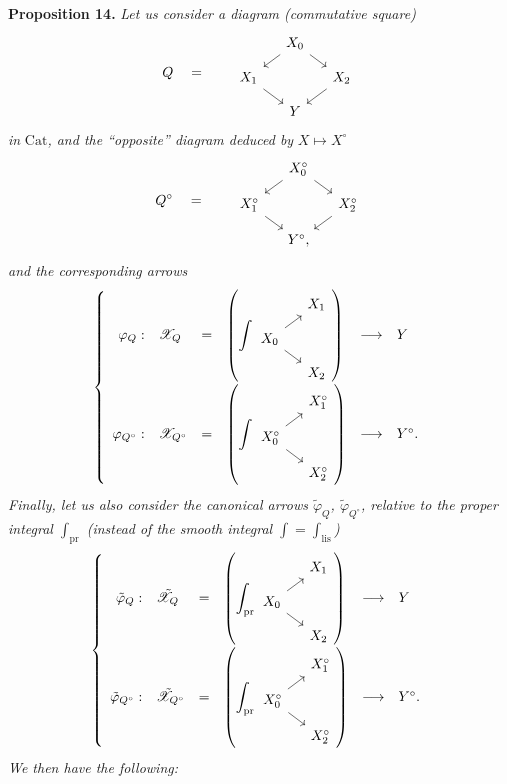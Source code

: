 \documentclass[11pt]{article}
\newcommand{\printedpage}[1]{\marginpar{\footnotesize p.~#1}}
\newcommand{\msp}[1]{\marginpar{\footnotesize [#1]}}
\newcommand{\Cat}{\mathrm{Cat}}
\newcommand{\sX}{\mathscr{X}}
\newcommand{\tsX}{\tilde{\mathscr{X}}}
\begin{document}
\textbf{Proposition 14.} \textit{Let us consider a diagram (commutative square)}
\[
Q \quad = \qquad
\begin{tikzcd}[row sep=small, column sep=small]
 & X_0 \arrow[dl] \arrow[dr] & \\
X_1 \arrow[dr] & & X_2 \arrow[dl] \\
 & Y &
\end{tikzcd}
\]
\textit{in} $\Cat$\textit{, and the ``opposite'' diagram deduced by} $X\longmapsto X^\circ$
\[
Q^\circ \quad = \qquad
\begin{tikzcd}[row sep=small, column sep=small]
 & X_0^\circ \arrow[dl] \arrow[dr] & \\
X_1^\circ \arrow[dr] & & X_2^\circ \arrow[dl] \\
 & Y^\circ, &
\end{tikzcd}
\]
\msp{page 141}
\textit{and the corresponding arrows}
\[
\left\{
\begin{array}{rlclcl}
\varphi_Q : & \sX_Q & = &
\left(\displaystyle\int
\begin{tikzcd}[ampersand replacement=\&, row sep=small, column sep=small]
 \& X_1 \\
X_0 \arrow[ur] \arrow[dr] \& \\
 \& X_2
\end{tikzcd}
\right)
& \longrightarrow & Y \\[2ex]
\varphi_{Q^\circ} : & \sX_{Q^\circ} & = &
\left(\displaystyle\int
\begin{tikzcd}[ampersand replacement=\&, row sep=small, column sep=small]
 \& X_1^\circ \\
X_0^\circ \arrow[ur] \arrow[dr] \& \\
 \& X_2^\circ
\end{tikzcd}
\right)
& \longrightarrow & Y^\circ.
\end{array}
\right.
\]
\textit{Finally, let us also consider the canonical arrows $\tilde{\varphi}_Q$, $\tilde{\varphi}_{Q^\circ}$, relative to the proper integral $\int_{\mathrm{pr}}$} %
\printedpage{97}
\textit{(instead of the smooth integral $\int=\int_{\mathrm{lis}}$)}
\[
\left\{
\begin{array}{rlclcl}
\tilde{\varphi}_Q : & \tsX_Q & = &
\left(\displaystyle\int_{\mathrm{pr}}
\begin{tikzcd}[ampersand replacement=\&, row sep=small, column sep=small]
 \& X_1 \\
X_0 \arrow[ur] \arrow[dr] \& \\
 \& X_2
\end{tikzcd}
\right)
& \longrightarrow & Y \\[2ex]
\tilde{\varphi}_{Q^\circ} : & \tsX_{Q^\circ} & = &
\left(\displaystyle\int_{\mathrm{pr}}
\begin{tikzcd}[ampersand replacement=\&, row sep=small, column sep=small]
 \& X_1^\circ \\
X_0^\circ \arrow[ur] \arrow[dr] \& \\
 \& X_2^\circ
\end{tikzcd}
\right)
& \longrightarrow & Y^\circ.
\end{array}
\right.
\]
\textit{We then have the following:}
\end{document}
